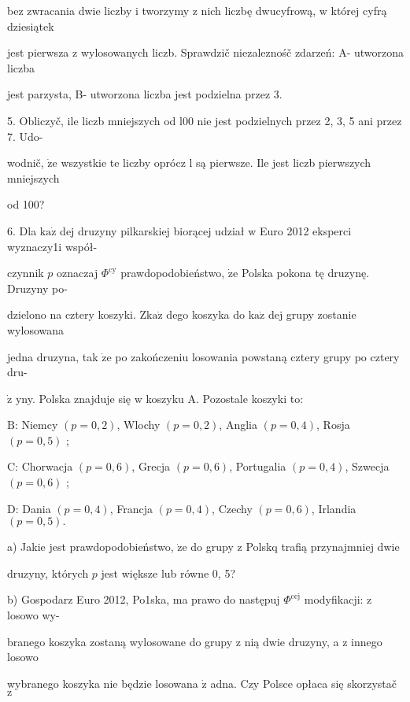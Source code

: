 \documentclass[a4paper,12pt]{article}
\begin{document}
bez zwracania dwie liczby $\mathrm{i}$ tworzymy $\mathrm{z}$ nich liczbę dwucyfrową, $\mathrm{w}$ której cyfrą dziesiątek

jest pierwsza $\mathrm{z}$ wylosowanych liczb. Sprawdzič niezaleznośč zdarzeń: A- utworzona liczba

jest parzysta, B- utworzona liczba jest podzielna przez 3.

5. Obliczyč, ile liczb mniejszych od l00 nie jest podzielnych przez 2, 3, 5 ani przez 7. Udo-

wodnič, $\dot{\mathrm{z}}\mathrm{e}$ wszystkie te liczby oprócz l są pierwsze. Ile jest liczb pierwszych mniejszych

od 100?

6. Dla $\mathrm{k}\mathrm{a}\dot{\mathrm{z}}$ dej druzyny pilkarskiej biorącej udział $\mathrm{w}$ Euro 2012 eksperci wyznaczy1i współ-

czynnik $p$ oznaczaj $\Phi^{\mathrm{c}\mathrm{y}}$ prawdopodobieństwo, $\dot{\mathrm{z}}\mathrm{e}$ Polska pokona tę druzynę. Druzyny po-

dzielono na cztery koszyki. $\mathrm{Z} \mathrm{k}\mathrm{a}\dot{\mathrm{z}}$ dego koszyka do $\mathrm{k}\mathrm{a}\dot{\mathrm{z}}$ dej grupy zostanie wylosowana

jedna druzyna, tak $\dot{\mathrm{z}}\mathrm{e}$ po zakończeniu losowania powstaną cztery grupy po cztery dru-

$\dot{\mathrm{z}}$ yny. Polska znajduje się $\mathrm{w}$ koszyku A. Pozostale koszyki to:

$\mathrm{B}$: Niemcy $(p=0,2)$, Wlochy $(p=0,2)$, Anglia $(p=0,4)$, Rosja $(p=0,5)$ ;

$\mathrm{C}$: Chorwacja $(p=0,6)$, Grecja $(p=0,6)$, Portugalia $(p=0,4)$, Szwecja $(p=0,6)$ ;

$\mathrm{D}$: Dania $(p=0,4)$, Francja $(p=0,4)$, Czechy $(p=0,6)$, Irlandia $(p=0,5).$

a) Jakie jest prawdopodobieństwo, $\dot{\mathrm{z}}\mathrm{e}$ do grupy $\mathrm{z}$ Polskq trafią przynajmniej dwie

druzyny, których $p$ jest większe lub równe 0, 5?

b) Gospodarz Euro 2012, Po1ska, ma prawo do następuj $\Phi^{\mathrm{c}\mathrm{e}\mathrm{j}}$ modyfikacji: $\mathrm{z}$ losowo wy-

branego koszyka zostaną wylosowane do grupy $\mathrm{z}$ nią dwie druzyny, a $\mathrm{z}$ innego losowo

wybranego koszyka nie będzie losowana $\dot{\mathrm{z}}$ adna. Czy Polsce opłaca się skorzystač $\mathrm{z}$
\end{document}

